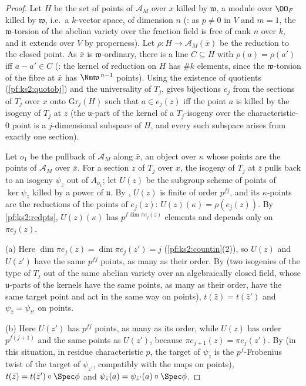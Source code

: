 \begin{proof}
Let $H$ be the set of points of $\mathcal A_M$ over $x$ killed by $\mathfrak w$, a module over
$\kstwoOF$ killed by $\mathfrak w$, i.e.\ a $k$-vector space, of dimension $n$
(: as $p\ne0$ in $V$ and $m=1$, the
$\mathfrak w$-torsion of the abelian variety over the fraction field is free of rank $n$ over $k$, and
it extends over $V$ by properness). Let $\rho\colon H\to\mathcal A_M(\bar x)$ be the reduction to the
closed point. As $\bar x$ is $\mathfrak w$-ordinary, there is a line $C\subseteq H$ with
$\rho(a)=\rho(a')$ iff $a-a'\in C$
(: the kernel of reduction on $H$
has $\#k$ elements, since the $\mathfrak w$-torsion of the fibre at $\bar x$ has $\Nm\mathfrak
w^{\,n-1}$ points). Using the existence of quotients (\cref{pf:ks2:quotobj}) and the universality of
$T_j$,  gives bijections $e_j$
from the sections of $T_j$ over $x$ onto $\mathrm{Gr}_j(H)$ such that $a\in e_j(z)$ iff the point $a$
is killed by the isogeny of $T_j$ at $z$ (the $\mathfrak u$-part of the kernel of a $T_j$-isogeny over
the characteristic-$0$ point is a $j$-dimensional subspace of $H$, and every such subspace arises
from exactly one section).

Let $o_1$ be the pullback of $\mathcal A_M$ along $\bar x$, an object over $\kappa$ whose points are
the points of $\mathcal A_M$ over $\bar x$. For a section $z$ of $T_j$ over $x$, the isogeny of $T_j$
at $\bar z$ pulls back to an isogeny $\psi_z$ out of $A_{o_1}$; let $U(z)$ be the subgroup
scheme of points of $\ker\psi_z$ killed by a power of $\mathfrak u$. By
, $U(z)$ is finite of order
$p^{fj}$, and its $\kappa$-points are the reductions of the points of $e_j(z)$:
$U(z)(\kappa)=\rho(e_j(z))$. By \cref{pf:ks2:redpts}, $U(z)(\kappa)$ has $p^{f\dim\pi e_j(z)}$
elements and depends only on $\pi e_j(z)$.

(a) Here $\dim\pi e_j(z)=\dim\pi e_j(z')=j$ (\cref{pf:ks2:countin}(2)), so $U(z)$ and $U(z')$ have the
same $p^{fj}$ points, as many as their order. By
 (two isogenies of the type of $T_j$
out of the same abelian variety over an algebraically closed field, whose $\mathfrak u$-parts of the
kernels have the same points, as many as their order, have the same target point and act in the
same way on points), $t(\bar z)=t(\bar z')$ and $\psi_{\bar z}=\psi_{\bar z'}$ on points.

(b) Here $U(z')$ has $p^{fj}$ points, as many as its order, while $U(z)$ has order $p^{f(j+1)}$ and the
same points as $U(z')$, because $\pi e_{j+1}(z)=\pi e_j(z')$. By
 (in this situation, in residue
characteristic $p$, the target of $\psi_z$ is the $p^f$-Frobenius twist of the target of
$\psi_{z'}$, compatibly with the maps on points), $t(\bar z)=t(\bar z')\circ\Spec\phi$ and
$\psi_{\bar z}(a)=\psi_{\bar z'}(a)\circ\Spec\phi$.
\end{proof}

